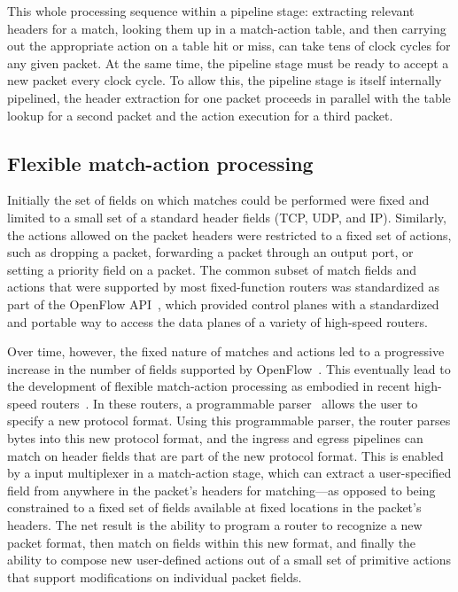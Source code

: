 This whole processing sequence within a pipeline stage: extracting relevant
headers for a match, looking them up in a match-action table, and then carrying
out the appropriate action on a table hit or miss, can take tens of clock
cycles for any given packet. At the same time, the pipeline stage must be ready
to accept a new packet every clock cycle. To allow this, the pipeline stage is
itself internally pipelined, \ie the header extraction for one packet proceeds
in parallel with the table lookup for a second packet and the action execution
for a third packet.

\subsection{Flexible match-action processing}
Initially the set of fields on which matches could be performed were fixed and
limited to a small set of a standard header fields (\eg TCP, UDP, and IP).
Similarly, the actions allowed on the packet headers were restricted to a fixed
set of actions, such as dropping a packet, forwarding a packet through an
output port, or setting a priority field on a packet. The common subset of
match fields and actions that were supported by most fixed-function routers was
standardized as part of the OpenFlow API~\cite{openflow}, which provided
control planes with a standardized and portable way to access the data planes
of a variety of high-speed routers.

Over time, however, the fixed nature of matches and actions led to a
progressive increase in the number of fields supported by OpenFlow~\cite{p4}.
This eventually lead to the development of flexible match-action processing as
embodied in recent high-speed routers~\cite{xpliant, flexpipe, tofino}. In
these routers, a programmable parser~\cite{gibb_parsing} allows the user to
specify a new protocol format. Using this programmable parser, the router
parses bytes into this new protocol format, and the ingress and egress
pipelines can match on header fields that are part of the new protocol format.
This is enabled by a input multiplexer in a match-action stage, which can
extract a user-specified field from anywhere in the packet's headers for
matching---as opposed to being constrained to a fixed set of fields available
at fixed locations in the packet's headers. The net result is the ability to
program a router to recognize a new packet format, then match on fields within
this new format, and finally the ability to compose new user-defined actions
out of a small set of primitive actions that support modifications on
individual packet fields.

